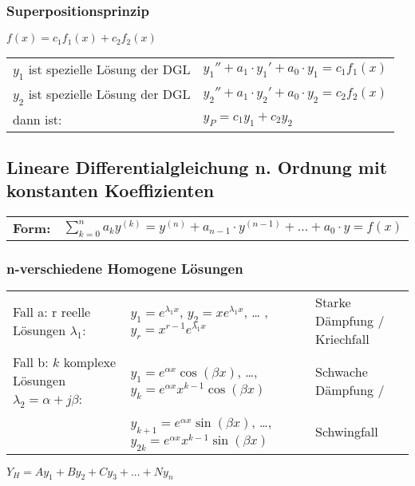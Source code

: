 

\subsubsection{Superpositionsprinzip}
$f(x)=c_1f_1(x)+c_2f_2(x)$\\
\begin{tabular}{p{8cm}p{8cm}}
$y_1$ ist spezielle Lösung der DGL &
$y_1''+a_1\cdot y_1'+a_0\cdot y_1=c_1f_1(x)$ \\
$y_2$ ist spezielle Lösung der DGL &
$y_2''+a_1\cdot y_2'+a_0\cdot y_2=c_2f_2(x)$ \\
dann ist:                          &
$y_P=c_1y_1+c_2y_2$\\
\end{tabular}

\subsection{Lineare Differentialgleichung n. Ordnung mit konstanten Koeffizienten }
	\begin{tabular}{p{1.5cm}p{8cm}}
		\textbf{Form:} &
		$\sum\limits_{k=0}^na_ky^{(k)}= y^{(n)}+a_{n-1}\cdot y^{(n-1)}+\ldots +a_0\cdot y=f(x)$\\
	\end{tabular}

\subsubsection{n-verschiedene Homogene Lösungen}
	\begin{tabular}{lll}
		Fall a: r reelle Lösungen $\lambda_1$: 
			& $y_1=e^{\lambda_1x}$, $y_2=xe^{\lambda_1x}$, \ldots
			,$y_r=x^{r-1}e^{\lambda_1x}$ 
			& Starke Dämpfung / Kriechfall\\
		Fall b: $k$ komplexe Lösungen $\lambda_2=\alpha +j\beta$: 
			&$y_1=e^{\alpha x}\cos(\beta x)$, \ldots, $y_k=e^{\alpha x}x^{k-1}\cos(\beta
		x)$
			& Schwache Dämpfung /\\
			&$y_{k+1}=e^{\alpha x}\sin(\beta x)$, \ldots, $y_{2k}=e^{\alpha
		x}x^{k-1}\sin(\beta x)$
			& Schwingfall\\
	\end{tabular}
	$Y_H = Ay_1 + By_2 + Cy_3 + ... + Ny_n$

